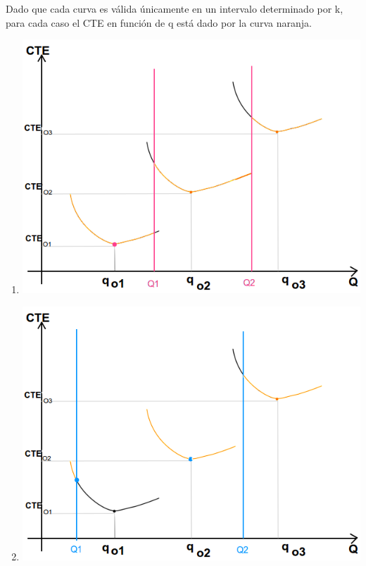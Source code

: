 \documentclass[a4paper,10pt]{article}
\begin{document}
Dado que cada curva es válida únicamente en un intervalo determinado por k, para cada caso el CTE en función de q está dado por la curva naranja.\\
\begin{enumerate}
  \item \includegraphics[scale=0.4,keepaspectratio=true]{img/8/8_QvsCTE_1b.png} 
  \item \includegraphics[scale=0.4,keepaspectratio=true]{img/8/8_QvsCTE_2b.png} 

\end{enumerate}
\end{document}
